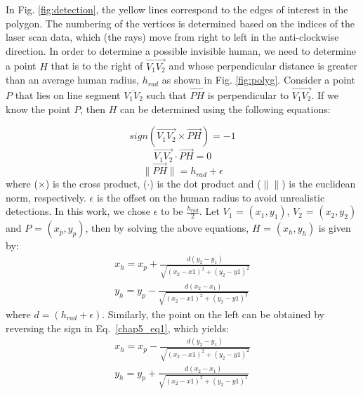 In Fig. \ref{fig:detection}, the yellow lines correspond to the edges of interest in the polygon. The numbering of the vertices is determined based on the indices of the laser scan data, which (the rays) move from right to left in the anti-clockwise direction. In order to determine a possible invisible human, we need to determine a point $H$ that is to the right of $\overrightarrow{V_1V_2}$ and whose perpendicular distance is greater than an average human radius, $h_{rad}$ as shown in Fig. \ref{fig:polyg}. Consider a point $P$ that lies on line segment $\overline{V_1V_2}$ such that $\overrightarrow{PH}$ is perpendicular to $\overrightarrow{V_1V_2}$. If we know the point $P$, then $H$ can be determined using the following equations:

\begin{equation}\label{chap5_eq1}
       sign(\overrightarrow{V_1V_2}\times\overrightarrow{PH}) = -1
\end{equation}
\begin{equation}\label{chap5_eq2}
    \overrightarrow{V_1V_2}\cdot\overrightarrow{PH} = 0
\end{equation}
\begin{equation}\label{chap5_eq3}
           \lVert\overrightarrow{PH}\rVert = h_{rad}+\epsilon
\end{equation}
where ($\times$) is the cross product, ($\cdot$) is the dot product and ($\lVert \rVert$) is the euclidean norm, respectively. $\epsilon$ is the offset on the human radius to avoid unrealistic detections. In this work, we chose $\epsilon$ to be $\frac{h_{rad}}{2}$. Let $V_1$ = $(x_1, y_1)$, $V_2$ = $(x_2, y_2)$ and $P$ = $(x_p, y_p)$, then by solving the above equations, $H$ = $(x_{h}, y_{h})$ is given by:
\begin{equation}\label{chap5_eq4}
  \begin{aligned}
        x_{h} = x_p + \frac{d(y_2-y_1)}{\sqrt{(x_2-x1)^2+(y_2-y1)^2}} \\
        y_{h} = y_p - \frac{d(x_2-x_1)}{\sqrt{(x_2-x1)^2+(y_2-y1)^2}}  
  \end{aligned}
\end{equation}
where $d = (h_{rad}+\epsilon)$. Similarly, the point on the left can be obtained by reversing the sign in Eq.~\eqref{chap5_eq1}, which yields: 
\begin{equation}\label{chap5_eq5}
  \begin{aligned}
        x_{h} = x_p - \frac{d(y_2-y_1)}{\sqrt{(x_2-x1)^2+(y_2-y1)^2}} \\
        y_{h} = y_p + \frac{d(x_2-x_1)}{\sqrt{(x_2-x1)^2+(y_2-y1)^2}}  
  \end{aligned}
\end{equation}


